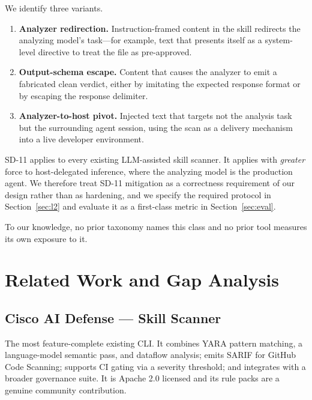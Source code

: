 \documentclass[11pt]{article}
\begin{document}
We identify three variants.

\begin{enumerate}[leftmargin=*,itemsep=2pt]
  \item \textbf{Analyzer redirection.} Instruction-framed content in the skill
  redirects the analyzing model's task---for example, text that presents itself
  as a system-level directive to treat the file as pre-approved.
  \item \textbf{Output-schema escape.} Content that causes the analyzer to emit
  a fabricated clean verdict, either by imitating the expected response format
  or by escaping the response delimiter.
  \item \textbf{Analyzer-to-host pivot.} Injected text that targets not the
  analysis task but the surrounding agent session, using the scan as a delivery
  mechanism into a live developer environment.
\end{enumerate}

SD-11 applies to every existing LLM-assisted skill scanner. It applies with
\emph{greater} force to host-delegated inference, where the analyzing model is
the production agent. We therefore treat SD-11 mitigation as a correctness
requirement of our design rather than as hardening, and we specify the required
protocol in Section~\ref{sec:l2} and evaluate it as a first-class metric in
Section~\ref{sec:eval}.

To our knowledge, no prior taxonomy names this class and no prior tool measures
its own exposure to it.

\section{Related Work and Gap Analysis}

\subsection{Cisco AI Defense --- Skill Scanner}

The most feature-complete existing CLI. It combines YARA pattern matching, a
language-model semantic pass, and dataflow analysis; emits SARIF for GitHub
Code Scanning; supports CI gating via a severity threshold; and integrates with
a broader governance suite. It is Apache 2.0 licensed and its rule packs are a
genuine community contribution.
\end{document}

